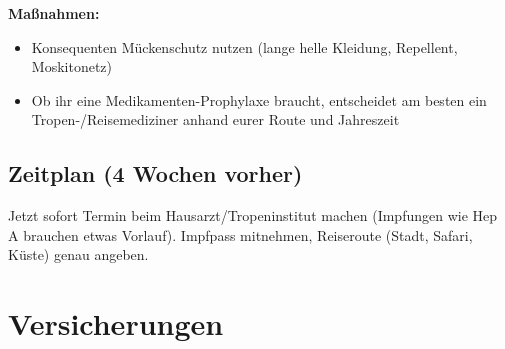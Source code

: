 \documentclass[12pt,a4paper]{article}
\begin{document}
\vspace{0.3cm}

\textbf{Maßnahmen:}
\begin{itemize}[leftmargin=*,label={\color{darkgreen}\faShieldAlt}]
    \item Konsequenten Mückenschutz nutzen (lange helle Kleidung, Repellent, Moskitonetz)
    \item Ob ihr eine Medikamenten-Prophylaxe braucht, entscheidet am besten ein Tropen-/Reisemediziner anhand eurer Route und Jahreszeit
\end{itemize}

\subsection{Zeitplan (4 Wochen vorher)}

\begin{actionbox}[title={\faClock \hspace{0.2cm} Sofort handeln!}]
Jetzt sofort Termin beim Hausarzt/Tropeninstitut machen (Impfungen wie Hep A brauchen etwas Vorlauf). Impfpass mitnehmen, Reiseroute (Stadt, Safari, Küste) genau angeben.
\end{actionbox}

\newpage
\section{Versicherungen}
\end{document}
